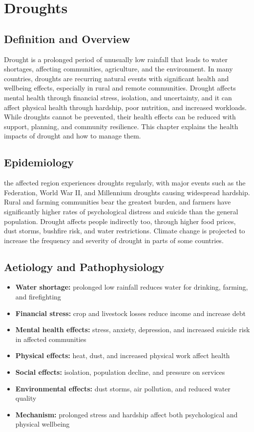 \chapter{Droughts}

\section*{Definition and Overview}
Drought is a prolonged period of unusually low rainfall that leads to water shortages, affecting communities, agriculture, and the environment. In many countries, droughts are recurring natural events with significant health and wellbeing effects, especially in rural and remote communities. Drought affects mental health through financial stress, isolation, and uncertainty, and it can affect physical health through hardship, poor nutrition, and increased workloads. While droughts cannot be prevented, their health effects can be reduced with support, planning, and community resilience. This chapter explains the health impacts of drought and how to manage them.

\section*{Epidemiology}
the affected region experiences droughts regularly, with major events such as the Federation, World War II, and Millennium droughts causing widespread hardship. Rural and farming communities bear the greatest burden, and farmers have significantly higher rates of psychological distress and suicide than the general population. Drought affects people indirectly too, through higher food prices, dust storms, bushfire risk, and water restrictions. Climate change is projected to increase the frequency and severity of drought in parts of some countries.

\section*{Aetiology and Pathophysiology}
\begin{itemize}
    \item \textbf{Water shortage:} prolonged low rainfall reduces water for drinking, farming, and firefighting
    \item \textbf{Financial stress:} crop and livestock losses reduce income and increase debt
    \item \textbf{Mental health effects:} stress, anxiety, depression, and increased suicide risk in affected communities
    \item \textbf{Physical effects:} heat, dust, and increased physical work affect health
    \item \textbf{Social effects:} isolation, population decline, and pressure on services
    \item \textbf{Environmental effects:} dust storms, air pollution, and reduced water quality
    \item \textbf{Mechanism:} prolonged stress and hardship affect both psychological and physical wellbeing
\end{itemize}

